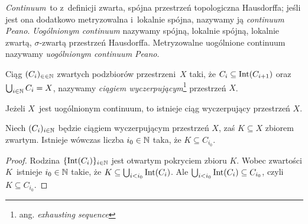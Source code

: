 \textit{Continuum}~to z~definicji zwarta, spójna przestrzeń topologiczna Hausdorffa; jeśli jest ona dodatkowo metryzowalna i~lokalnie spójna, nazywamy ją \textit{continuum Peano}. \textit{Uogólnionym continuum} nazywamy spójną, lokalnie spójną, lokalnie zwartą, \mbox{$\sigma$-zwartą} przestrzeń Hausdorffa. Metryzowalne uogólnione continuum nazywamy \textit{uogólnionym continuum Peano}.

Ciąg $(C_i)_{\in\in\mathbb{N}}$ zwartych podzbiorów przestrzeni~$X$ taki, że $C_i\subseteq \operatorname{Int}(C_{i+1})$ oraz $\bigcup_{i\in\mathbb{N}} C_i=X$, nazywamy \textit{ciągiem wyczerpującym}\footnote{ang. \textit{exhausting sequence}} przestrzeń $X$.

\begin{lem}\label{lem-istnieje_ciag_wyczerpujacy}
Jeżeli $X$~jest uogólnionym continuum, to istnieje ciąg wyczerpujący przestrzeń $X$.
\end{lem}

\begin{lem}\label{lem-sigma_zwarta_kazdy_zwarty_w_wyczerpujacym}
Niech $(C_i)_{i\in\mathbb{N}}$ będzie ciągiem wyczerpującym przestrzeń $X$, zaś $K\subseteq X$ zbiorem zwartym. Istnieje wówczas liczba $i_0\in\mathbb{N}$ taka, że $K\subseteq C_{i_0}$.
\end{lem}
\begin{proof}
Rodzina $\{\operatorname{Int}(C_i)\}_{i\in\mathbb{N}}$ jest otwartym pokryciem zbioru $K$. Wobec zwartości $K$~istnieje $i_0\in\mathbb{N}$ takie, że $K\subseteq \bigcup_{i<i_0}\operatorname{Int}(C_i)$. Ale $\bigcup_{i<i_0}\operatorname{Int}(C_i)\subseteq C_{i_0}$, czyli $K\subseteq C_{i_0}$. 
\end{proof}

